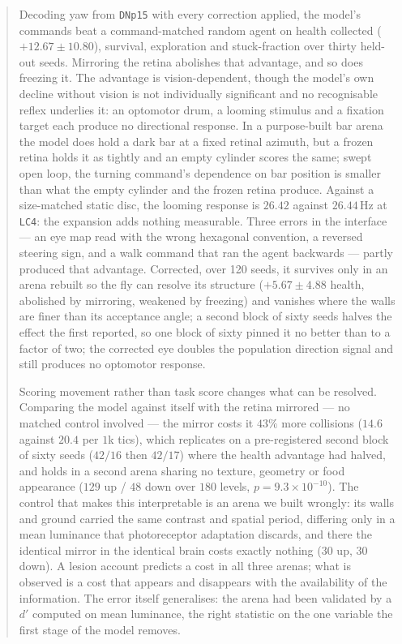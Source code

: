 \documentclass[10pt,twoside]{article}
\newcommand{\cell}[1]{\texttt{#1}}
\begin{document}
\begin{abstract}
Decoding yaw from \cell{DNp15} with every correction applied, the model's
commands beat a command-matched random agent on health collected
($+12.67\pm10.80$), survival, exploration and stuck-fraction over thirty
held-out seeds. Mirroring the retina abolishes that advantage, and so does
freezing it. The advantage is vision-dependent, though the model's own decline
without vision is not individually significant and no recognisable reflex
underlies it: an optomotor drum, a looming stimulus and a fixation target each
produce no directional response. In a purpose-built bar arena the model does
hold a dark bar at a fixed retinal azimuth, but a frozen retina holds it as
tightly and an empty cylinder scores the same; swept open loop, the turning
command's dependence on bar position is smaller than what the empty cylinder
and the frozen retina produce. Against a size-matched static disc,
the looming response is $26.42$ against $26.44$\,Hz at \cell{LC4}: the
expansion adds nothing measurable. Three errors in the interface --- an eye map
read with the wrong hexagonal convention, a reversed steering sign, and a walk
command that ran the agent backwards --- partly produced that advantage.
Corrected, over 120 seeds, it survives only in an arena rebuilt so the fly can
resolve its structure ($+5.67\pm4.88$ health, abolished by mirroring, weakened
by freezing) and vanishes where the walls are finer than its acceptance angle;
a second block of sixty seeds halves the effect the first reported, so one
block of sixty pinned it no better than to a factor of two;
the corrected eye doubles the population direction signal and still produces no
optomotor response.

Scoring movement rather than task score changes what can be resolved. Comparing
the model against itself with the retina mirrored --- no matched control
involved --- the mirror costs it $43\%$ more collisions ($14.6$ against $20.4$
per $1$k tics), which replicates on a pre-registered second block of sixty
seeds ($42/16$ then $42/17$) where the health advantage had halved, and holds
in a second arena sharing no texture, geometry or food appearance
($129$ up / $48$ down over $180$ levels, $p=9.3\times10^{-10}$). The control
that makes this interpretable is an arena we built wrongly: its walls and
ground carried the same contrast and spatial period, differing only in a mean
luminance that photoreceptor adaptation discards, and there the identical
mirror in the identical brain costs exactly nothing ($30$ up, $30$ down). A
lesion account predicts a cost in all three arenas; what is observed is a cost
that appears and disappears with the availability of the information. The error
itself generalises: the arena had been validated by a $d'$ computed on mean
luminance, the right statistic on the one variable the first stage of the model
removes.


\end{abstract}
\end{document}
